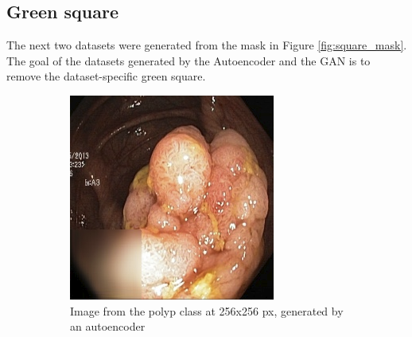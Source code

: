 \subsection{Green square}
The next two datasets were generated from the mask in Figure \ref{fig:square_mask}.  The goal of the datasets generated by the Autoencoder and the GAN is to remove the dataset-specific green square. 


        \begin{figure}
        \centering
        \begin{subfigure}[t]{0.4\textwidth}
            \centering
            \includegraphics[width=\textwidth]{experiments/figures/greensquare/polypAE.png}
            \caption{Image from the polyp class at 256x256 px, generated by an autoencoder }   
            \label{fig:polyp_AE_SQUARE1}
        \end{subfigure}
        \qquad
        \begin{subfigure}[t]{0.4\textwidth}  
            \centering 

\end{subfigure}
\end{figure}
